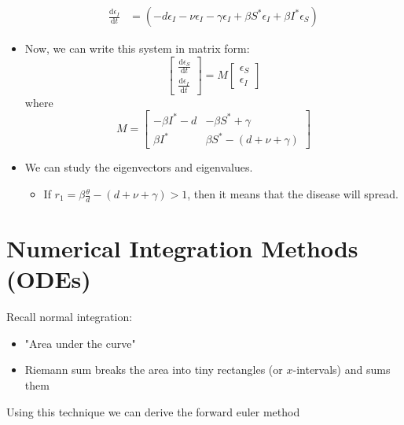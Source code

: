 \documentclass[10pt]{article}
\newcommand{\dd}{\text{d}}
\begin{document}
\begin{itemize}
\begin{align*}
        \frac{\dd \epsilon_I}{\dd t} &= (-d\epsilon_I - \nu \epsilon_I - \gamma \epsilon_I + \beta S^* \epsilon_I + \beta I^* \epsilon_S)
    \end{align*}
    \item Now, we can write this system in matrix form:
    \[\begin{bmatrix} \frac{\dd \epsilon_S}{\dd t} \\ \frac{\dd \epsilon_I}{\dd t} \end{bmatrix} = M \begin{bmatrix} \epsilon_S \\ \epsilon_I \end{bmatrix}\]
    where
    \[M = \begin{bmatrix} -\beta I^* - d & -\beta S^* + \gamma \\ \beta I^* & \beta S^* - (d + \nu + \gamma) \end{bmatrix}\]
    \item We can study the eigenvectors and eigenvalues.
    \begin{itemize}
        \item If $r_1 = \beta \frac{\theta}{d} - (d + \nu + \gamma) > 1$, then it means that the disease will spread.
    \end{itemize}
\end{itemize}

\section*{Numerical Integration Methods (ODEs)}
Recall normal integration:
\begin{itemize}
	\item "Area under the curve"
	\item Riemann sum breaks the area into tiny rectangles (or $x$-intervals) and sums them
\end{itemize}
Using this technique we can derive the forward euler method
\end{document}
